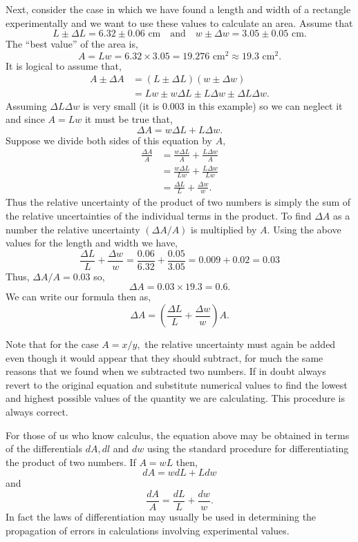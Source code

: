 \documentclass[main.tex]{subfiles}
\begin{document}
Next, consider the case in which we have found a length and width of a rectangle experimentally and we want to use these  values to calculate an area.  Assume that
\[
L \pm \Delta L = 6.32\pm 0.06\text{ cm} \quad \text{and} \quad w \pm \Delta w = 3.05 \pm 0.05\text{ cm}.
\]
The ``best value'' of the area is,
\[
A = Lw = 6.32 \times 3.05 = 19.276\text{ cm}^2\approx 19.3\text{ cm}^2.
\]
It is logical to assume that,
\begin{align*}
A \pm \Delta A &= (L \pm \Delta L) (w \pm \Delta w)\\
		&=Lw \pm w\Delta L \pm L\Delta w \pm \Delta L \Delta w.
\end{align*}
Assuming $\Delta L \Delta w$ is very small (it is 0.003 in this example) so we can neglect it and since $A=Lw$ it must be true that,
\[
\Delta A = w\Delta L + L\Delta w.
\]
Suppose we divide both sides of this equation by $A,$
\begin{align*}
\frac{\Delta A}{A} &= \frac{w\Delta L}{A} + \frac{L\Delta w}{A}\\
		&=\frac{w\Delta L}{Lw} + \frac{L\Delta w}{Lw}\\
		&=\frac{\Delta L}{L} + \frac{\Delta w}{w}.
\end{align*}
Thus the relative uncertainty of the product of two numbers is simply the sum of the relative uncertainties of the individual terms in the product.  To find  $\Delta A$ as a number the relative uncertainty $(\Delta A/A)$ is multiplied by $A.$  Using the above values for the length and width we have,
\[
\frac{\Delta L}{L} +\frac{\Delta w}{w} = \frac{0.06}{6.32}+\frac{0.05}{3.05} = 0.009 + 0.02 = 0.03
\]
Thus, $\Delta A/A=0.03$ so,
\[
\Delta A = 0.03 \times 19.3 = 0.6.
\]
We can write our formula then as,
\[
\Delta A = \left(\frac{\Delta L}{L} + \frac{\Delta w}{w}\right)A.
\]

Note that for the case $A = x/y,$ the relative uncertainty must again be added even though it would appear that they should subtract, for much the same reasons that we found when we subtracted two numbers.  If in doubt always revert to the original equation and substitute numerical values to find the lowest and highest possible values of the quantity we are calculating.  This procedure is always correct.

For those of us who know calculus, the equation above may be obtained in terms of the differentials $dA, dl$ and $dw$ using the standard procedure for differentiating the product of two numbers. If $A = wL$ then,
\[
dA = wdL + Ldw
\]
and
\[
\frac{dA}{A}=\frac{dL}{L}+\frac{dw}{w}.
\]
In fact the laws of differentiation may usually be used in determining the propagation of errors in calculations involving experimental values.
\end{document}
